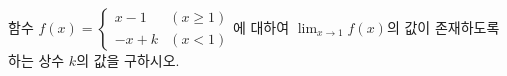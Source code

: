 함수 $f(x)=\begin{cases} x-1 & (x\ge 1) \\ -x+k & (x<1) \end{cases}$에 대하여 $\displaystyle\lim_{x\to 1}f(x)$의 값이 존재하도록 하는 상수 $k$의 값을 구하시오.

